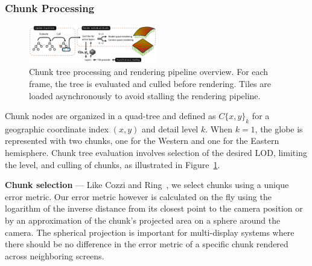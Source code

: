 \documentclass[journal]{vgtc}                %
\newcommand{\fig}[1]{Figure~\ref{fig:#1}}
\begin{document}
\subsubsection{Chunk Processing} \label{sec:chunktree}
\begin{figure}
  \centering
    \includegraphics[width=0.5\textwidth]{figures/rendering-pipeline.pdf}
  \caption{Chunk tree processing and rendering pipeline overview. For each frame, the tree is evaluated and culled before rendering. Tiles are loaded asynchronously to avoid stalling the rendering pipeline.}  \vspace{-4mm}
  \label{fig:chunkproc}%
\end{figure}



Chunk nodes are organized in a quad-tree and defined as $C\{x, y\}_k$ for a geographic coordinate index $\left( x,y \right)$ and detail level $k$. When $k=1$, the globe is represented with two chunks, one for the Western and one for the Eastern hemisphere.
Chunk tree evaluation involves selection of the desired LOD, limiting the level, and culling of chunks, as illustrated in \fig{chunkproc}.


\noindent\textbf{Chunk selection} ---
Like Cozzi and Ring~\cite{cozzi20113d}, we select chunks using a unique error metric. Our error metric however is calculated on the fly using the logarithm of the inverse distance from its closest point to the camera position or by an approximation of the chunk's projected area on a sphere around the camera.
The spherical projection is important for multi-display systems where there should be no difference in the error metric of a specific chunk rendered across neighboring screens.
\end{document}
